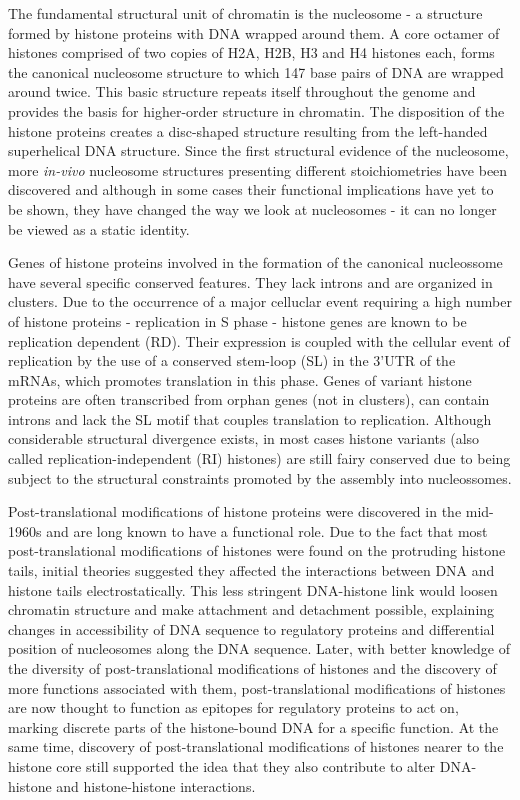 \documentclass[11pt,twoside,a4paper]{report}
\begin{document}
	The fundamental structural unit of chromatin is the nucleosome - a structure formed by histone proteins with DNA wrapped around them. A core octamer of histones comprised of two copies of H2A, H2B, H3 and H4 histones each, forms the canonical nucleosome structure to which 147 base pairs of DNA are wrapped around twice. This basic structure repeats itself throughout the genome and provides the basis for higher-order structure in chromatin. The disposition of the histone proteins creates a disc-shaped structure resulting from the left-handed superhelical DNA structure. Since the first structural evidence of the nucleosome, more \textit{in-vivo} nucleosome structures presenting different stoichiometries have been discovered and although in some cases their functional implications have yet to be shown, they have changed the way we look at nucleosomes - it can no longer be viewed as a static identity.

	Genes of histone proteins involved in the formation of the canonical nucleossome have several specific conserved features. They lack introns and are organized in clusters. Due to the occurrence of a major celluclar event requiring a high number of histone proteins - replication in S phase - histone genes are known to be replication dependent (RD). Their expression is coupled with the cellular event of replication by the use of a conserved stem-loop (SL) in the 3’UTR of the mRNAs, which promotes translation in this phase. Genes of variant histone proteins are often transcribed from orphan genes (not in clusters), can contain introns and lack the SL motif that couples translation to replication. Although considerable structural divergence exists, in most cases histone variants (also called replication-independent (RI) histones) are still fairy conserved due to being subject to the structural constraints promoted by the assembly into nucleossomes.
			
	Post-translational modifications of histone proteins were discovered in the mid-1960s and are long known to have a functional role. Due to the fact that most post-translational modifications of histones were found on the protruding histone tails, initial theories suggested they affected the interactions between DNA and histone tails electrostatically. This less stringent DNA-histone link would loosen chromatin structure and make attachment and detachment possible, explaining changes in accessibility of DNA sequence to regulatory proteins and differential position of nucleosomes along the DNA sequence. Later, with better knowledge of the diversity of post-translational modifications of histones and the discovery of more functions associated with them, post-translational modifications of histones are now thought to function as epitopes for regulatory proteins to act on, marking discrete parts of the histone-bound DNA for a specific function. At the same time, discovery of post-translational modifications of histones nearer to the histone core still supported the idea that they also contribute to alter DNA-histone and histone-histone interactions.
	 
\end{document}
